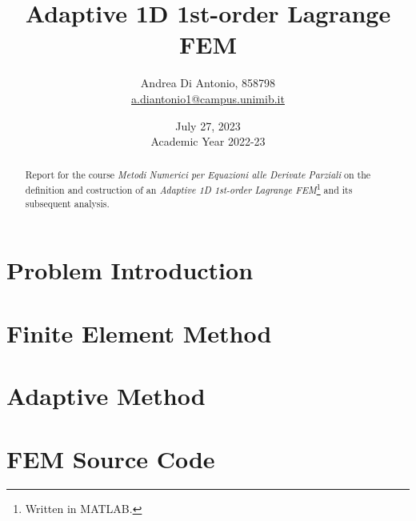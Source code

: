 \documentclass[12pt]{article}
\title{Adaptive 1D 1st-order Lagrange FEM}
\author{Andrea Di Antonio, 858798 \\ \hyperlink{mailto:a.diantonio1@campus.unimib.it}{a.diantonio1@campus.unimib.it}}
\date{July 27, 2023 \\ Academic Year 2022-23}
\begin{document}
	\maketitle
	\thispagestyle{fancy}

	\begin{abstract}
		\begin{center}
            Report for the course \textit{Metodi Numerici per Equazioni alle Derivate Parziali} on the definition and costruction of an \textit{Adaptive 1D 1st-order Lagrange FEM}\footnote{Written in MATLAB.} and its subsequent analysis.
        \end{center}
	\end{abstract}

    \newpage
    \tableofcontents

    \newpage
    \section{Problem Introduction}
    

    \newpage
    \section{Finite Element Method}

    \newpage
    \section{Adaptive Method}

    \newpage
    \section{FEM Source Code}
    
\end{document}
